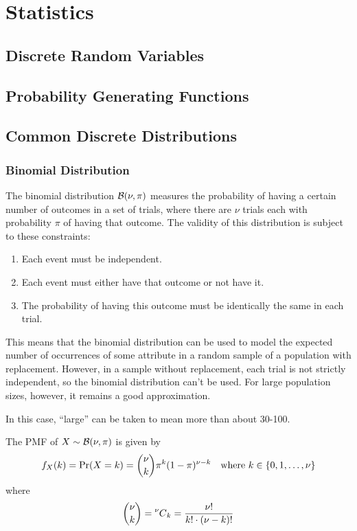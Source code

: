 \section{Statistics}

\subsection{Discrete Random Variables}

\subsection{Probability Generating Functions}

\subsection{Common Discrete Distributions}

\subsubsection{Binomial Distribution}


The binomial distribution \(\operatorname{\mathcal{B}}(\nu, \pi)\) measures the probability
of having a certain number of outcomes in a set of trials,  where there are
\(\nu\) trials each with probability \(\pi\) of having that outcome.
The validity of this distribution is subject to these constraints:
\begin{enumerate}
\item Each event must be independent.
\item Each event must either have that outcome or not have it.
\item The probability of having this outcome must be identically the same in
      each trial.
\end{enumerate}
This means that the binomial distribution can be used to model the expected
number of occurrences of some attribute in a random sample of a population
with replacement. However, in a sample without replacement, each trial is
not strictly independent, so the binomial distribution can't be used. For
large population sizes, however, it remains a good approximation.

In this case, ``large'' can be taken to mean more than about 30-100.

The PMF of \(X \sim \operatorname{\mathcal{B}}(\nu, \pi)\) is given by
\begin{equation*}
f_X(k) = \operatorname{\mathrm{Pr}}(X = k) = \binom \nu k \pi^k (1 - \pi)^{\nu - k}
    \quad \text{where \(k \in \{0, 1, \dotsc, \nu\}\)}
\end{equation*}
where
\begin{equation*}
\binom \nu k = \prescript{\nu\mkern-0.5mu}{}C_{k} = \frac{\nu!}{k!\cdot (\nu - k)!}
\end{equation*}

